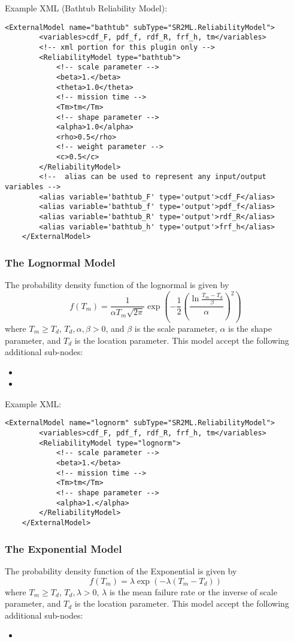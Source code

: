 Example XML (Bathtub Reliability Model):
\begin{lstlisting}[style=XML]
	<ExternalModel name="bathtub" subType="SR2ML.ReliabilityModel">
		<variables>cdf_F, pdf_f, rdf_R, frf_h, tm</variables>
		<!-- xml portion for this plugin only -->
		<ReliabilityModel type="bathtub">
			<!-- scale parameter -->
			<beta>1.</beta>
			<theta>1.0</theta>
			<!-- mission time -->
			<Tm>tm</Tm>
			<!-- shape parameter -->
			<alpha>1.0</alpha>
			<rho>0.5</rho>
			<!-- weight parameter -->
			<c>0.5</c>
		</ReliabilityModel>
		<!--  alias can be used to represent any input/output variables -->
		<alias variable='bathtub_F' type='output'>cdf_F</alias>
		<alias variable='bathtub_f' type='output'>pdf_f</alias>
		<alias variable='bathtub_R' type='output'>rdf_R</alias>
		<alias variable='bathtub_h' type='output'>frf_h</alias>
	</ExternalModel>
\end{lstlisting}

\subsubsection{The Lognormal Model}
The probability density function of the lognormal is given by
\begin{equation}
	f(T_m) = \frac{1}{\alpha T_m\sqrt{2\pi}}\exp\left(-\frac{1}{2}\left(\frac{\ln{\frac{T_m-T_d}{\beta}}}{\alpha}\right)^2\right)
\end{equation}
where $T_m\geq T_d$, $T_d, \alpha, \beta >0$, and $\beta$ is the scale parameter, $\alpha$ is the shape
parameter, and $T_d$ is the location parameter.
This model accept the following additional sub-nodes:
\begin{itemize}
	\item {}
	\item {}
\end{itemize}

Example XML:
\begin{lstlisting}[style=XML]
	<ExternalModel name="lognorm" subType="SR2ML.ReliabilityModel">
		<variables>cdf_F, pdf_f, rdf_R, frf_h, tm</variables>
		<ReliabilityModel type="lognorm">
			<!-- scale parameter -->
			<beta>1.</beta>
			<!-- mission time -->
			<Tm>tm</Tm>
			<!-- shape parameter -->
			<alpha>1.</alpha>
		</ReliabilityModel>
	</ExternalModel>
\end{lstlisting}

\subsubsection{The Exponential Model}
The probability density function of the Exponential is given by
\begin{equation}
	f(T_m) = \lambda\exp\left(-\lambda\left(T_m-T_d\right)\right)
\end{equation}
where $T_m\geq T_d$, $T_d, \lambda >0$, $\lambda$ is the mean failure rate or the inverse of scale parameter,
and $T_d$ is the location parameter.
This model accept the following additional sub-nodes:
\begin{itemize}
	\item {}
\end{itemize}

